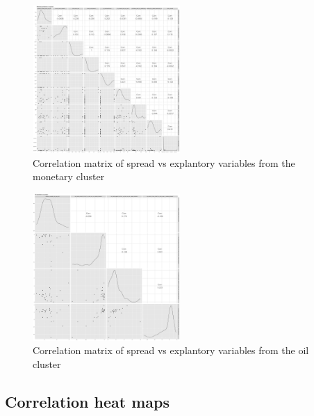 \documentclass[11pt,]{article}
\begin{document}
\begin{figure}
\centering
\includegraphics[width=0.5\textwidth,height=\textheight]{reportfigures/Corrmatrix_spread_vs_monetary.png}
\caption{Correlation matrix of spread vs explantory variables from the
monetary cluster}
\end{figure}

\begin{figure}
\centering
\includegraphics[width=0.5\textwidth,height=\textheight]{reportfigures/Corrmatrix_spread_vs_oil.png}
\caption{Correlation matrix of spread vs explantory variables from the
oil cluster}
\end{figure}

\hypertarget{correlation-heat-maps}{%
\subsection{Correlation heat maps}\label{correlation-heat-maps}}
\end{document}
